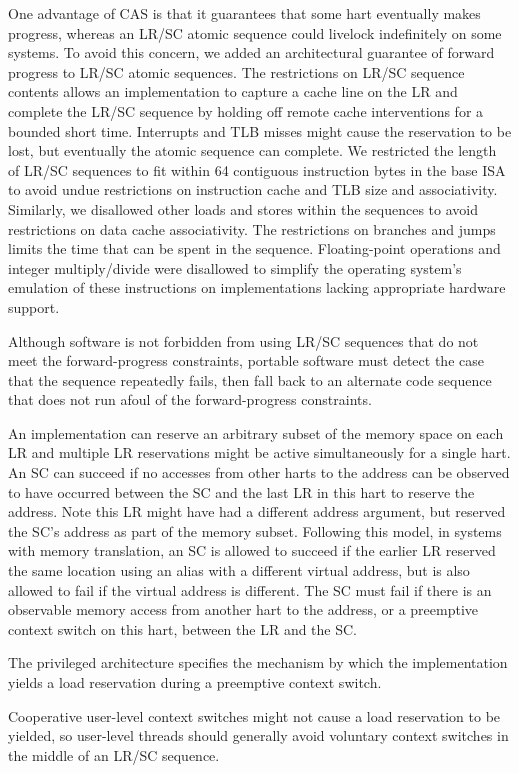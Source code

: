 \begin{commentary}
One advantage of CAS is that it guarantees that some hart eventually
makes progress, whereas an LR/SC atomic sequence could livelock
indefinitely on some systems.  To avoid this concern, we added an
architectural guarantee of forward progress to LR/SC atomic sequences.
The restrictions on LR/SC sequence contents allows an implementation
to capture a cache line on the LR and complete the LR/SC sequence by
holding off remote cache interventions for a bounded short
time. Interrupts and TLB misses might cause the reservation to be
lost, but eventually the atomic sequence can complete.  We restricted
the length of LR/SC sequences to fit within 64 contiguous instruction
bytes in the base ISA to avoid undue restrictions on instruction cache
and TLB size and associativity.  Similarly, we disallowed other loads
and stores within the sequences to avoid restrictions on data cache
associativity.  The restrictions on branches and jumps limits the time
that can be spent in the sequence.  Floating-point operations and
integer multiply/divide were disallowed to simplify the operating
system's emulation of these instructions on implementations lacking
appropriate hardware support.

Although software is not forbidden from using LR/SC sequences that do not meet
the forward-progress constraints, portable software must detect the case that
the sequence repeatedly fails, then fall back to an alternate code sequence
that does not run afoul of the forward-progress constraints.
\end{commentary}

An implementation can reserve an arbitrary subset of the memory space
on each LR and multiple LR reservations might be active simultaneously
for a single hart.  An SC can succeed if no accesses from other harts
to the address can be observed to have occurred between the SC and
the last LR in this hart to reserve the address.  Note this LR might
have had a different address argument, but reserved the SC's address
as part of the memory subset.  Following this model, in systems with
memory translation, an SC is allowed to succeed if the earlier LR
reserved the same location using an alias with a different virtual
address, but is also allowed to fail if the virtual address is
different.  The SC must fail if there is an observable memory access
from another hart to the address, or a preemptive context switch on
this hart, between the LR and the SC.

\begin{commentary}
The privileged architecture specifies the mechanism by which the
implementation yields a load reservation during a preemptive context switch.

Cooperative user-level context switches might not cause a load reservation
to be yielded, so user-level threads should generally avoid voluntary
context switches in the middle of an LR/SC sequence.
\end{commentary}

